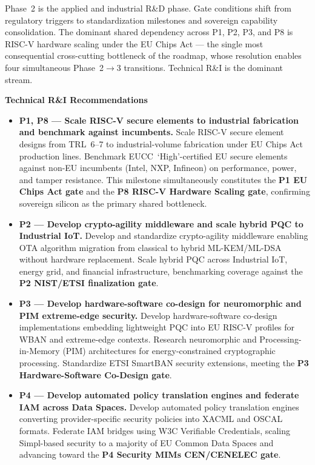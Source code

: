 Phase~2 is the applied and industrial R\&D phase. Gate conditions shift
from regulatory triggers to standardization milestones and sovereign
capability consolidation. The dominant shared dependency across P1, P2,
P3, and P8 is RISC-V hardware scaling under the EU Chips Act --- the
single most consequential cross-cutting bottleneck of the roadmap, whose
resolution enables four simultaneous Phase~2$\to$3 transitions. Technical
R\&I is the dominant stream.

\textbf{Technical R\&I Recommendations}

\begin{itemize}

    \item \textbf{P1, P8 --- Scale RISC-V secure elements to industrial
    fabrication and benchmark against incumbents.}
    Scale RISC-V secure element designs from TRL~6--7 to
    industrial-volume fabrication under EU Chips Act production lines.
    Benchmark EUCC~`High'-certified EU secure elements against non-EU
    incumbents (Intel, NXP, Infineon) on performance, power, and
    tamper resistance. This milestone simultaneously constitutes the
    \textbf{P1 EU Chips Act gate} and the
    \textbf{P8 RISC-V Hardware Scaling gate}, confirming sovereign
    silicon as the primary shared bottleneck.

    \item \textbf{P2 --- Develop crypto-agility middleware and scale
    hybrid PQC to Industrial IoT.}
    Develop and standardize crypto-agility middleware enabling OTA
    algorithm migration from classical to hybrid ML-KEM/ML-DSA without
    hardware replacement. Scale hybrid PQC across Industrial IoT,
    energy grid, and financial infrastructure, benchmarking coverage
    against the \textbf{P2 NIST/ETSI finalization gate}.

    \item \textbf{P3 --- Develop hardware-software co-design for
    neuromorphic and PIM extreme-edge security.}
    Develop hardware-software co-design implementations embedding
    lightweight PQC into EU RISC-V profiles for WBAN and extreme-edge
    contexts. Research neuromorphic and Processing-in-Memory (PIM)
    architectures for energy-constrained cryptographic processing.
    Standardize ETSI SmartBAN security extensions, meeting the
    \textbf{P3 Hardware-Software Co-Design gate}.

    \item \textbf{P4 --- Develop automated policy translation engines
    and federate IAM across Data Spaces.}
    Develop automated policy translation engines converting
    provider-specific security policies into XACML and OSCAL formats.
    Federate IAM bridges using W3C Verifiable Credentials, scaling
    Simpl-based security to a majority of EU Common Data Spaces and
    advancing toward the \textbf{P4 Security MIMs CEN/CENELEC gate}.


\end{itemize}
